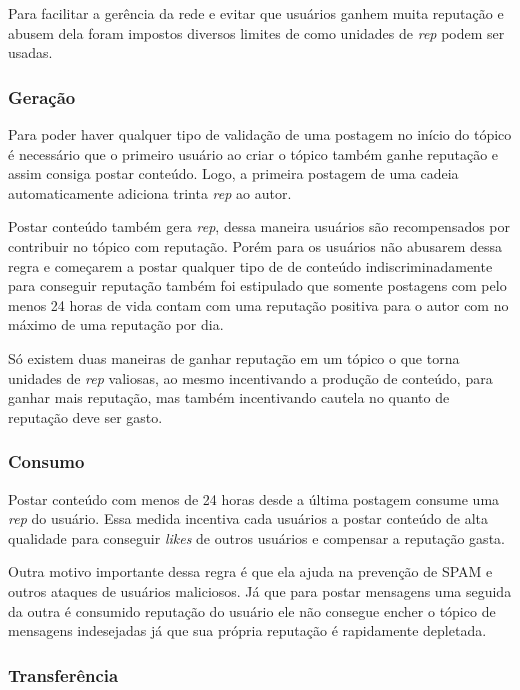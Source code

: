 \documentclass[12pt]{article}
\begin{document}
Para facilitar a gerência da rede e evitar que usuários ganhem muita reputação e abusem dela foram impostos diversos limites de como unidades de \emph{rep} podem ser usadas. 

\subsubsection{Geração} \label{subsubsec:geracao}

Para poder haver qualquer tipo de validação de uma postagem no início do tópico é necessário que o primeiro usuário ao criar o tópico também ganhe reputação e assim consiga postar conteúdo. Logo, a primeira postagem de uma cadeia automaticamente adiciona trinta \emph{rep} ao autor. 

Postar conteúdo também gera \emph{rep}, dessa maneira usuários são recompensados por contribuir no tópico com reputação. Porém para os usuários não abusarem dessa regra e começarem a postar qualquer tipo de de conteúdo indiscriminadamente para conseguir reputação também foi estipulado que somente postagens com pelo menos 24 horas de vida contam com uma reputação positiva para o autor com no máximo de uma reputação por dia. 

Só existem duas maneiras de ganhar reputação em um tópico o que torna unidades de \emph{rep} valiosas, ao mesmo incentivando a produção de conteúdo, para ganhar mais reputação, mas também incentivando cautela no quanto de reputação deve ser gasto.  

\subsubsection{Consumo} \label{subsubsec:consumo}

Postar conteúdo com menos de 24 horas desde a última postagem consume uma \emph{rep} do usuário. Essa medida incentiva cada usuários a postar conteúdo de alta qualidade para conseguir \emph{likes} de outros usuários e compensar a reputação gasta.

Outra motivo importante dessa regra é que ela ajuda na prevenção de SPAM e outros ataques de usuários maliciosos. Já que para postar mensagens uma seguida da outra é consumido reputação do usuário ele não consegue encher o tópico de mensagens indesejadas já que sua própria reputação é rapidamente depletada. 

\subsubsection{Transferência} \label{subsubsec:transfe}
\end{document}
